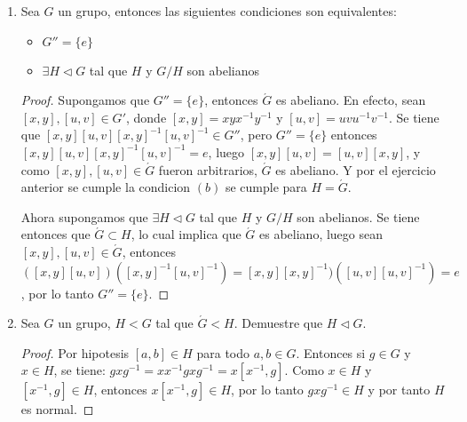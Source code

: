 \documentclass{article}
\theoremstyle{break}
\begin{document}
\begin{enumerate}
		\begin{proof}
			Note que 
			
			$g(xyx^{-1}y^{-1})g^{-1}=(gxg^{-1})(gyg{-1})(gx^{-1}g^{-1})(gy^{-1}g^{-1})=(gxg^{-1})(gyg^{-1})(gxg^{-1})^{-1}(gyg^{-1})^{-1}$.
			
			Entonces $g(xyx^{-1}y^{-1})g^{-1}$ es de la forma $(gxg^{-1})(gyg^{-1})(gxg^{-1})^{-1}(gyg^{-1})^{-1}$ y por tanto $g(xyx^{-1}y^{-1})g^{-1}\in \acute{G}$. Luego $\acute{G}$ es normal.
			
			Veamos ahora que $G/\acute{G}$ es abeliano. En efecto, sean $X,Y\in G/\acute{G}$ con $X=x\acute{G}$, $Y=y\acute{G}$, entonces $YX=(y\acute{G})(x\acute{G})=yx(x^{-1}y^{-1}xy)\acute{G}=xy\acute{G}=XY$.
		\end{proof}
		
		\item Sea $G$ un grupo, entonces las siguientes condiciones son equivalentes:
		
\begin{itemize}


			\item $G''=\{e\}$
			\item $\exists H\triangleleft G$ tal que $H$ y $G/H$ son abelianos
\end{itemize}
		
		\begin{proof}
			Supongamos que $G''=\{e\}$, entonces $\acute{G}$ es abeliano. En efecto, sean $[x,y],[u,v]\in G'$, donde $[x,y]=xyx^{-1}y^{-1}$ y $[u,v]=uvu^{-1}v^{-1}$. Se tiene que $[x,y][u,v][x,y]^{-1}[u,v]^{-1}\in G''$, pero $G''=\{e\}$ entonces $[x,y][u,v][x,y]^{-1}[u,v]^{-1}=e$, luego $[x,y][u,v]=[u,v][x,y]$, y como $[x,y],[u,v]\in \acute{G}$ fueron arbitrarios, $\acute{G}$ es abeliano. Y por el ejercicio anterior se cumple la condicion $(b)$ se cumple para $H=\acute{G}$.
			
			Ahora supongamos que $\exists H\triangleleft G$ tal que $H$ y $G/H$ son abelianos. Se tiene entonces que $\acute{G}\subset H$, lo cual implica que $\acute{G}$ es abeliano, luego sean $[x,y],[u,v]\in \acute{G}$, entonces $([x,y][u,v])([x,y]^{-1}[u,v]^{-1})=[x,y][x,y]^{-1})([u,v][u,v]^{-1})=e$, por lo tanto $G''=\{e\}$.
		\end{proof}
		
		\item Sea $G$ un grupo, $H<G$ tal que $\acute{G} <H$. Demuestre que $H\triangleleft G$.
		
		\begin{proof}
			Por hipotesis $[a,b]\in H$ para todo $a,b\in G$. Entonces si $g\in G$ y $x\in H$, se tiene: $ gxg^{-1}=xx^{-1}gxg^{-1}=x[x^{-1},g]$. Como $x\in H$ y $[x^{-1},g]\in H$, entonces $x[x^{-1},g]\in H$, por lo tanto $gxg^{-1}\in H$ y por tanto $H$ es normal.
		\end{proof}
		

\end{enumerate}
\end{document}
